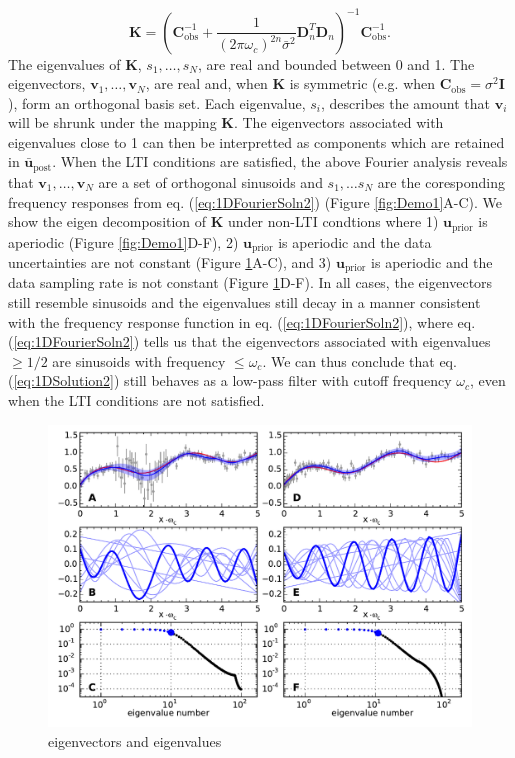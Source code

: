 \documentclass[10pt,a4paper]{article}
\begin{document}
\begin{equation}\label{eq:Kernel}
\mathbf{K} = (\mathbf{C}_\mathrm{obs}^{-1} + 
              \frac{1}{(2\pi\omega_c)^{2n}\bar{\sigma}^2}\mathbf{D}_n^T\mathbf{D}_n)^{-1}\mathbf{C}_\mathrm{obs}^{-1}.
\end{equation}
The eigenvalues of $\mathbf{K}$, $s_1, \dots, s_N$, are real and bounded between 0 and 1.  The eigenvectors, $\mathbf{v}_1, \dots,\mathbf{v}_N$, are real and, when $\mathbf{K}$ is symmetric (e.g. when $\mathbf{C}_\mathrm{obs} = \sigma^2 \mathbf{I}$), form an orthogonal basis set.  Each eigenvalue, $s_i$,  describes the amount that $\mathbf{v}_i$ will be shrunk under the mapping $\mathbf{K}$.  The eigenvectors associated with eigenvalues close to 1 can then be interpretted as components which are retained in $\mathbf{\bar{u}}_\mathrm{post}$. When the LTI conditions are satisfied, the above Fourier analysis reveals that $\mathbf{v}_1, \dots, \mathbf{v}_N$ are a set of orthogonal sinusoids and $s_1, \dots s_N$ are the coresponding frequency responses from eq. (\ref{eq:1DFourierSoln2}) (Figure \ref{fig:Demo1}A-C). We show the eigen decomposition of $\mathbf{K}$ under non-LTI condtions where 1) $\mathbf{u}_\mathrm{prior}$ is aperiodic (Figure \ref{fig:Demo1}D-F), 2) $\mathbf{u}_\mathrm{prior}$ is aperiodic and the data uncertainties are not constant (Figure \ref{fig:Demo2}A-C), and 3) $\mathbf{u}_\mathrm{prior}$ is aperiodic and the data sampling rate is not constant (Figure \ref{fig:Demo2}D-F). In all cases, the eigenvectors still resemble sinusoids and the eigenvalues still decay in a manner consistent with the frequency response function in eq. (\ref{eq:1DFourierSoln2}), where eq. (\ref{eq:1DFourierSoln2}) tells us that the eigenvectors associated with eigenvalues ${\geq}1/2$ are sinusoids with frequency ${\leq}\omega_c$. We can thus conclude that eq. (\ref{eq:1DSolution2}) still behaves as a low-pass filter with cutoff frequency $\omega_c$, even when the LTI conditions are not satisfied.  

\begin{figure}
\includegraphics[scale=1.0]{figures/figure3}
\caption{eigenvectors and eigenvalues}   
\label{fig:Demo2}
\end{figure}
\end{document}

